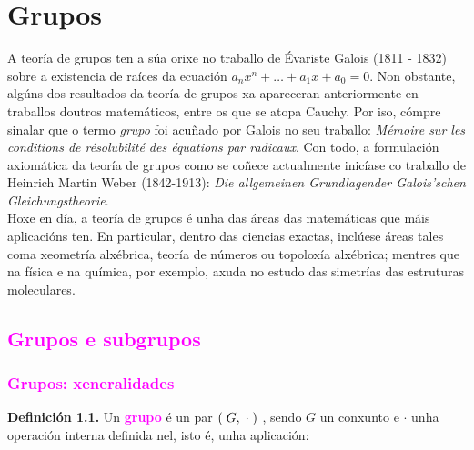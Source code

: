 \documentclass[twoside]{report}
\theoremstyle{mystyle}
\begin{document}

\clearpage %
\begingroup
  \pagestyle{empty}
  \null
  \newpage
\endgroup

\tableofcontents

\thispagestyle{noheader}

\newpage

\chapter[Unidade 1. Grupos]{\textbf{Grupos}}

\thispagestyle{noheader}

    \noindent A teoría de grupos ten a súa orixe no traballo de Évariste Galois (1811 - 1832) sobre a existencia de raíces da ecuación $a_{n}x^{n} + \dots + a_{1}x + a_{0} = 0$. Non obstante, algúns dos resultados da teoría de grupos xa apareceran anteriormente en traballos doutros matemáticos, entre os que se atopa Cauchy. Por iso, cómpre sinalar que o termo \textit{grupo} foi acuñado por Galois no seu traballo: \textit{Mémoire sur les conditions de résolubilité des équations par radicaux}. Con todo, a formulación axiomática da teoría de grupos como se coñece actualmente inicíase co traballo de Heinrich Martin Weber (1842-1913): \textit{Die allgemeinen Grundlagender Galois’schen Gleichungstheorie}.\\
    
    \noindent Hoxe en día, a teoría de grupos é unha das áreas das matemáticas que máis aplicacións ten. En particular, dentro das ciencias exactas, inclúese áreas tales coma xeometría alxébrica, teoría de números ou topoloxía alxébrica; mentres que na física e na química, por exemplo, axuda no estudo das simetrías das estruturas moleculares.

\textcolor{magenta}{\section{Grupos e subgrupos}}

\textcolor{magenta}{\subsection{Grupos: xeneralidades}}

\vspace{5mm}

\noindent \textbf{Definición 1.1.} Un \textbf{\textcolor{magenta}{grupo}} é un par $( \hspace{1mm} G, \hspace{1mm} \cdot \hspace{1mm})$ , sendo $G$ un conxunto e  $\cdot$ unha operación interna definida nel, isto é, unha aplicación:
\end{document}
